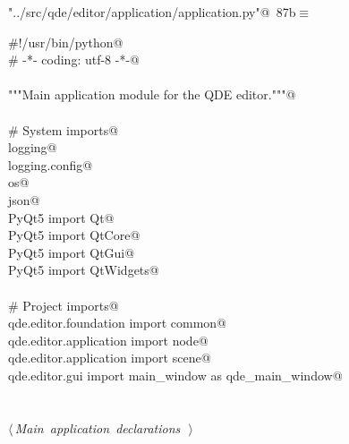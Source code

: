 \documentclass[
    a4paper,      %
    10pt,         %
    openright,    %
    notitlepage,  %
    parskip=half, %
]{scrreprt}       %
\theoremstyle{definition}                    %
\begin{document}
\begin{flushleft} \small
\begin{minipage}{\linewidth}\label{scrap137}\raggedright\small
{} \verb@"../src/qde/editor/application/application.py"@\nobreak\ {\footnotesize {87b}}$\equiv$
\vspace{-1ex}
\begin{list}{}{} \item
\mbox{}\lstinline@#!/usr/bin/python@\\
\mbox{}\lstinline@# -*- coding: utf-8 -*-@\\
\mbox{}\lstinline@@\\
\mbox{}\lstinline@"""Main application module for the QDE editor."""@\\
\mbox{}\lstinline@@\\
\mbox{}\lstinline@# System imports@\\
\mbox{}\lstinline@import logging@\\
\mbox{}\lstinline@import logging.config@\\
\mbox{}\lstinline@import os@\\
\mbox{}\lstinline@import json@\\
\mbox{}\lstinline@from PyQt5 import Qt@\\
\mbox{}\lstinline@from PyQt5 import QtCore@\\
\mbox{}\lstinline@from PyQt5 import QtGui@\\
\mbox{}\lstinline@from PyQt5 import QtWidgets@\\
\mbox{}\lstinline@@\\
\mbox{}\lstinline@# Project imports@\\
\mbox{}\lstinline@from qde.editor.foundation import common@\\
\mbox{}\lstinline@from qde.editor.application import node@\\
\mbox{}\lstinline@from qde.editor.application import scene@\\
\mbox{}\lstinline@from qde.editor.gui import main_window as qde_main_window@\\
\mbox{}\lstinline@@\\
\mbox{}\lstinline@@\\
\mbox{}\lstinline@@\hbox{$\langle\,${\itshape Main application declarations}\nobreak\ {\footnotesize {}}$\,\rangle$}\lstinline@@\\
\mbox{}\lstinline@@{\NWsep}
\end{list}
\vspace{-1.5ex}
\footnotesize
\begin{list}{}{\setlength{\itemsep}{-\parsep}\setlength{\itemindent}{-\leftmargin}}

\item{}
\end{list}
\end{minipage}\vspace{4ex}
\end{flushleft}
\end{document}
